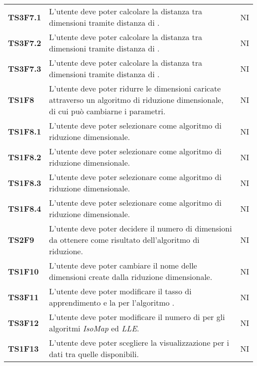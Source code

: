{\begin{longtable}{ C{2cm} | C{12cm}| C{1.5cm} }
\textbf{TS3F7.1} & 
L'utente deve poter calcolare la distanza tra dimensioni tramite distanza di . & 
NI\\

\textbf{TS3F7.2} & 
L'utente deve poter calcolare la distanza tra dimensioni tramite distanza di . & 
NI\\

\textbf{TS3F7.3} & 
L'utente deve poter calcolare la distanza tra dimensioni tramite distanza di . & 
NI\\

\textbf{TS1F8} & 
L'utente deve poter ridurre le dimensioni caricate attraverso un algoritmo di riduzione dimensionale, di cui può cambiarne i parametri. & 
NI\\

\textbf{TS1F8.1} & 
L'utente deve poter selezionare  come algoritmo di riduzione dimensionale. & 
NI\\

\textbf{TS1F8.2} & 
L'utente deve poter selezionare  come algoritmo di riduzione dimensionale. & 
NI\\

\textbf{TS1F8.3} & 
L'utente deve poter selezionare  come algoritmo di riduzione dimensionale. & 
NI\\

\textbf{TS1F8.4} & 
L'utente deve poter selezionare  come algoritmo di riduzione dimensionale. & 
NI\\

\textbf{TS2F9} & 
L'utente deve poter decidere il numero di dimensioni da ottenere come risultato dell'algoritmo di riduzione. & 
NI\\

\textbf{TS1F10} & 
L'utente deve poter cambiare il nome delle dimensioni create dalla riduzione dimensionale. & 
NI\\

\textbf{TS3F11} & 
L'utente deve poter modificare il tasso di apprendimento e la  per l'algoritmo . & 
NI\\

\textbf{TS3F12} & 
L'utente deve poter modificare il numero di  per gli algoritmi \textit{IsoMap} ed \textit{LLE}. & 
NI\\

\textbf{TS1F13} & 
L'utente deve poter scegliere la visualizzazione per i dati tra quelle disponibili. & 
NI\\


\end{longtable}}
